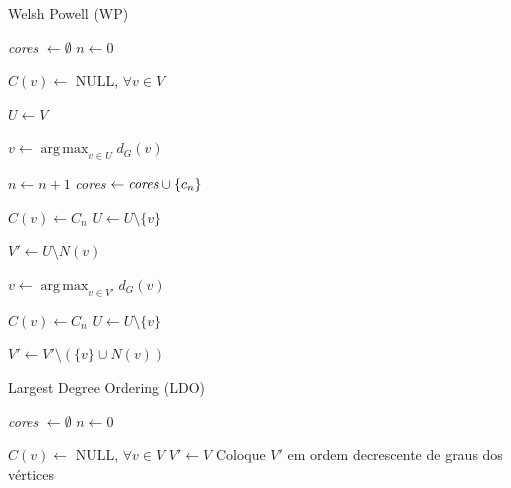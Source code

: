 \documentclass[10pt, twocolumn]{article}
\DeclareMathOperator*{\argmax}{arg\,max}
\begin{document}

\begin{algorithm}
\caption{Welsh Powell (WP)}
\label{alg:wp}


\emph{cores} $\gets \emptyset$\;
$n \gets 0$\;

$C(v) \gets$ NULL, $\forall v \in V$\;

$U \gets V$\;

 {
    $v \gets \argmax_{v \in U} d_G(v)$\;

    $n \gets n + 1$\;
    \emph{cores} $\gets \emph{cores} \cup \{c_n\}$\;

    $C(v) \gets C_n$\;
    $U \gets U \setminus \{v\}$\;

    $V' \gets U \setminus N(v)$\;

     {
        $v \gets \argmax_{v \in V'} d_G(v)$\;
        
        $C(v) \gets C_n$\;
        $U \gets U \setminus \{v\}$\;

        $V' \gets V' \setminus (\{v\} \cup N(v))$\;
    }
}

\;

\end{algorithm}



\begin{algorithm}
\caption{Largest Degree Ordering (LDO)}
\label{alg:ldo}


\emph{cores} $\gets \emptyset$\;
$n \gets 0$\;

$C(v) \gets$ NULL, $\forall v \in V$\;
$V' \gets V$\;
Coloque $V'$ em ordem decrescente de graus dos vértices\;

 {
     {
    }
}
\;

\end{algorithm}


\end{document}
